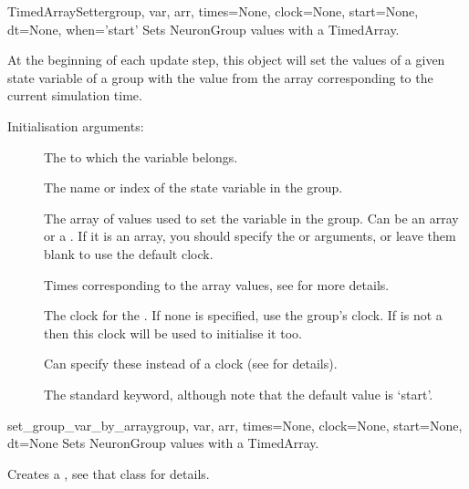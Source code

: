 \documentclass[letterpaper,10pt,english]{manual}
\begin{document}
\hypertarget{brian.TimedArraySetter}{}\begin{classdesc}{TimedArraySetter}{group, var, arr, times=None, clock=None, start=None, dt=None, when='start'}
Sets NeuronGroup values with a TimedArray.

At the beginning of each update step, this object will set the
values of a given state variable of a group with the value from
the array corresponding to the current simulation time.

Initialisation arguments:
\begin{description}
\item[]
The \hyperlink{brian.NeuronGroup}{} to which the variable belongs.

\item[]
The name or index of the state variable in the group.

\item[]
The array of values used to set the variable in the group.
Can be an array or a \hyperlink{brian.TimedArray}{}. If it is an array,
you should specify the  or  arguments, or
leave them blank to use the default clock.

\item[]
Times corresponding to the array values, see \hyperlink{brian.TimedArray}{}
for more details.

\item[]
The clock for the \hyperlink{brian.NetworkOperation}{}. If none is specified,
use the group's clock. If  is not a \hyperlink{brian.TimedArray}{}
then this clock will be used to initialise it too.

\item[]
Can specify these instead of a clock (see \hyperlink{brian.TimedArray}{} for
details).

\item[]
The standard \hyperlink{brian.NetworkOperation}{}  keyword, although
note that the default value is `start'.

\end{description}
\end{classdesc}

\hypertarget{brian.set_group_var_by_array}{}\begin{funcdesc}{set\_group\_var\_by\_array}{group, var, arr, times=None, clock=None, start=None, dt=None}
Sets NeuronGroup values with a TimedArray.

Creates a \hyperlink{brian.TimedArraySetter}{}, see that class for details.
\end{funcdesc}
\end{document}
